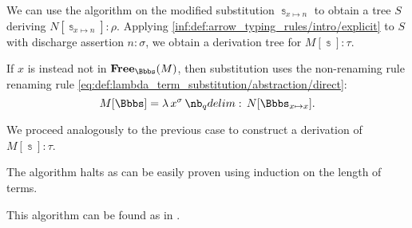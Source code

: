 \begin{algorithm}
\begin{thmenum}
\begin{thmenum}
      We can use the algorithm on the modified substitution \( \Bbbs_{x \mapsto n} \) to obtain a tree \( S \) deriving \( N[\Bbbs_{x \mapsto n}]: \rho \). Applying \ref{inf:def:arrow_typing_rules/intro/explicit} to \( S \) with discharge assertion \( n: \sigma \), we obtain a derivation tree for \( M[\Bbbs]: \tau \).

       If \( x \) is instead not in \( \op*{Free}_\Bbbs(M) \), then substitution uses the non-renaming rule renaming rule \eqref{eq:def:lambda_term_substitution/abstraction/direct}:
      \begin{equation*}
        M[\Bbbs] = \qabs {x^\sigma} N[\Bbbs_{x \mapsto x}].
      \end{equation*}

      We proceed analogously to the previous case to construct a derivation of \( M[\Bbbs]: \tau \).
    \end{thmenum}
  \end{thmenum}
\end{algorithm}
\begin{defproof}
  The algorithm halts as can be easily proven using induction on the length of terms.
\end{defproof}
\begin{comments}
  \item This algorithm can be found as  in \cite{notebook:code}.
\end{comments}

